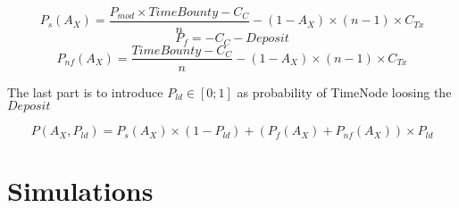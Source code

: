\documentclass{article}
\begin{document}
\[
P_{s}(A_{X})=\frac{P_{mod} \times TimeBounty-C_{C}}{n} - (1-A_{X}) \times (n-1) \times C_{Tx}
\]
\[
P_{f}=-C_{C}-Deposit
\]
\[
P_{nf}(A_{X})=\frac{TimeBounty-C_{C}}{n} - (1-A_{X}) \times (n-1) \times C_{Tx}
\]

The last part is to introduce $P_{ld} \in [0;1]$ as probability of TimeNode loosing the $Deposit$

\[
P(A_{X}, P_{ld})=P_{s}(A_{X}) \times (1-P_{ld}) + (P_{f}(A_{X})+P_{nf}(A_{X})) \times P_{ld}
\]
\section{Simulations}
\end{document}
